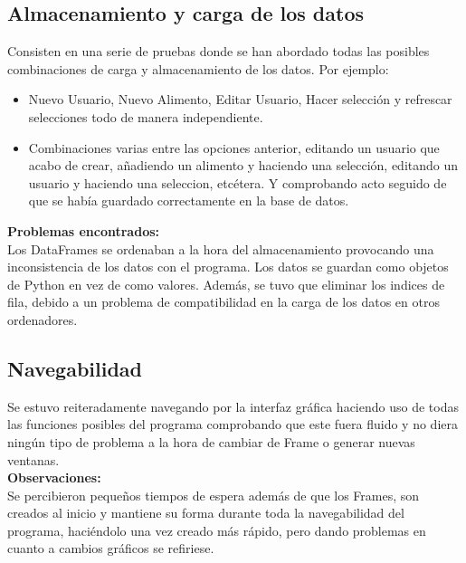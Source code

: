 \subsection{Almacenamiento y carga de los datos}
Consisten en una serie de pruebas donde se han abordado todas las posibles combinaciones de carga y almacenamiento de los datos. Por ejemplo:
\begin{itemize}
\item Nuevo Usuario, Nuevo Alimento, Editar Usuario, Hacer selección y refrescar selecciones todo de manera independiente.
\item Combinaciones varias entre las opciones anterior, editando un usuario que acabo de crear, añadiendo un alimento y haciendo una selección, editando un usuario y haciendo una seleccion, etcétera. Y comprobando acto seguido de que se había guardado correctamente en la base de datos.
\end{itemize}
\textbf{Problemas encontrados:}\\
Los DataFrames se ordenaban a la hora del almacenamiento provocando una inconsistencia de los datos con el programa. Los datos se guardan como objetos de Python en vez de como valores. Además, se tuvo que eliminar los indices de fila, debido a un problema de compatibilidad en la carga de los datos en otros ordenadores.
\subsection{Navegabilidad}
Se estuvo reiteradamente navegando por la interfaz gráfica haciendo uso de todas las funciones posibles del programa comprobando que este fuera fluido y no diera ningún tipo de problema a la hora de cambiar de Frame o generar nuevas ventanas.\\
\textbf{Observaciones:}\\
Se percibieron pequeños tiempos de espera además de que los Frames, son creados al inicio y mantiene su forma durante toda la navegabilidad del programa, haciéndolo una vez creado más rápido, pero dando problemas en cuanto a cambios gráficos se refiriese.
